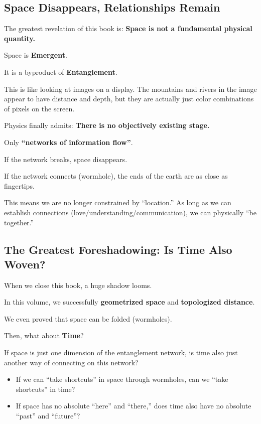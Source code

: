\subsection{Space Disappears, Relationships Remain}

The greatest revelation of this book is: \textbf{Space is not a fundamental physical quantity.}

Space is \textbf{Emergent}.

It is a byproduct of \textbf{Entanglement}.

This is like looking at images on a display. The mountains and rivers in the image appear to have distance and depth, but they are actually just color combinations of pixels on the screen.

Physics finally admits: \textbf{There is no objectively existing stage.}

Only \textbf{``networks of information flow''}.

If the network breaks, space disappears.

If the network connects (wormhole), the ends of the earth are as close as fingertips.

This means we are no longer constrained by ``location.'' As long as we can establish connections (love/understanding/communication), we can physically ``be together.''

\subsection{The Greatest Foreshadowing: Is Time Also Woven?}

When we close this book, a huge shadow looms.

In this volume, we successfully \textbf{geometrized space} and \textbf{topologized distance}.

We even proved that space can be folded (wormholes).

Then, what about \textbf{Time}?

If space is just one dimension of the entanglement network, is time also just another way of connecting on this network?

\begin{itemize}
\item If we can ``take shortcuts'' in space through wormholes, can we ``take shortcuts'' in time?

\item If space has no absolute ``here'' and ``there,'' does time also have no absolute ``past'' and ``future''?
\end{itemize}

